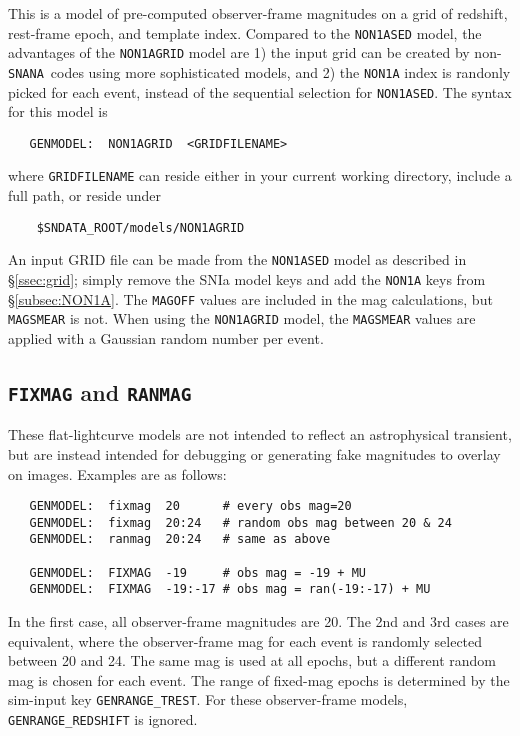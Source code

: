 \documentclass[12pt]{article}
\newcommand{\FIXMAG}{{\tt FIXMAG}}
\newcommand{\RANMAG}{{\tt RANMAG}}
\newcommand{\snana}{{\tt SNANA}}
\begin{document}
This is a model of pre-computed observer-frame magnitudes on 
a grid of redshift, rest-frame epoch, and template index.
Compared to the {\tt NON1ASED} model, the advantages of
the {\tt NON1AGRID} model are 1) the input grid can be
created by non-\snana\ codes using more sophisticated models,
and 2) the {\tt NON1A} index is randonly picked for each event,
instead of the sequential selection for {\tt NON1ASED}.
The syntax for this model is
\begin{verbatim}
   GENMODEL:  NON1AGRID  <GRIDFILENAME>
\end{verbatim}
%
where {\tt GRIDFILENAME} can reside either in your current
working directory, include a full path, or reside under
\begin{verbatim}
    $SNDATA_ROOT/models/NON1AGRID
\end{verbatim}
%
An input GRID file can be made from the {\tt NON1ASED} model
as described in \S\ref{ssec:grid}; simply remove the SNIa model
keys and add the {\tt NON1A} keys from \S\ref{subsec:NON1A}.
The {\tt MAGOFF} values are included in the mag calculations,
but {\tt MAGSMEAR} is not. When using the {\tt NON1AGRID} model,
the {\tt MAGSMEAR} values are applied with a Gaussian random
number per event.

\subsection{{\FIXMAG} and {\RANMAG}}
\label{subsec:fixmag}

These flat-lightcurve models are not intended to reflect an 
astrophysical transient, but are instead intended for debugging 
or generating fake magnitudes to overlay on images.
Examples are as follows:
%
\begin{verbatim}
   GENMODEL:  fixmag  20      # every obs mag=20
   GENMODEL:  fixmag  20:24   # random obs mag between 20 & 24
   GENMODEL:  ranmag  20:24   # same as above

   GENMODEL:  FIXMAG  -19     # obs mag = -19 + MU
   GENMODEL:  FIXMAG  -19:-17 # obs mag = ran(-19:-17) + MU
\end{verbatim}
%
In the first case, all observer-frame magnitudes are 20.
The 2nd and 3rd cases are equivalent, where the observer-frame mag 
for each event is randomly selected between 20 and 24.
The same mag is used at all epochs, but a different random mag
is chosen for each event. The range of fixed-mag epochs
is determined by the sim-input key {\tt GENRANGE\_TREST}.
For these observer-frame models, 
{\tt GENRANGE\_REDSHIFT} is ignored.
\end{document}
